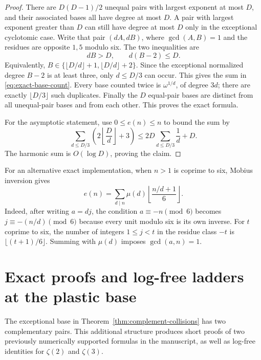 \begin{proof}
There are $D(D-1)/2$ unequal pairs with largest exponent at most
$D$, and their associated bases all have degree at most $D$.
A pair with largest exponent greater than $D$ can still have degree
at most $D$ only in the exceptional cyclotomic case.  Write that
pair $(dA,dB)$, where $\gcd(A,B)=1$ and the residues are opposite
$1,5$ modulo six.  The two inequalities are
\[
dB>D,\qquad d(B-2)\le D.
\]
Equivalently,
$B\in\{\lfloor D/d\rfloor+1,\lfloor D/d\rfloor+2\}$.
Since the exceptional normalized degree $B-2$ is at least three,
only $d\le D/3$ can occur.  This gives the sum in
\eqref{eq:exact-base-count}.
Every base counted twice is $\omega^{1/d}$, of degree $3d$;
there are exactly $\lfloor D/3\rfloor$ such duplicates.
Finally the $D$ equal-pair bases are distinct from all unequal-pair
bases and from each other.  This proves the exact formula.

For the asymptotic statement, use $0\le e(n)\le n$ to bound the sum
by
\[
\sum_{d\le D/3}\left(2\left\lfloor\frac Dd\right\rfloor+3\right)
\le2D\sum_{d\le D/3}\frac1d+D.
\]
The harmonic sum is $O(\log D)$, proving the claim.
\end{proof}

For an alternative exact implementation, when $n>1$ is coprime to
six, Mobius inversion gives
\begin{equation}
e(n)=\sum_{d\mid n}\mu(d)
       \left\lfloor\frac{n/d+1}{6}\right\rfloor.
\label{eq:exceptional-count-mobius}
\end{equation}
Indeed, after writing $a=dj$, the condition
$a\equiv-n\pmod6$ becomes $j\equiv-(n/d)\pmod6$ because every
unit modulo six is its own inverse.  For $t$ coprime to six,
the number of integers $1\le j<t$ in the residue class $-t$
is $\lfloor(t+1)/6\rfloor$.  Summing with $\mu(d)$ imposes
$\gcd(a,n)=1$.


\section{Exact proofs and log-free ladders at the plastic base}
\label{sec:plastic-proofs}

The exceptional base in Theorem~\ref{thm:complement-collisions}
has two complementary pairs.  This additional structure produces
short proofs of two previously numerically supported formulas in
the manuscript, as well as log-free identities for $\zeta(2)$ and
$\zeta(3)$.

